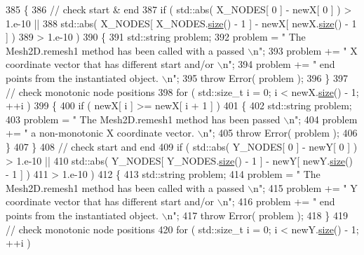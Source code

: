 \begin{DoxyCode}
385   \{
386     \textcolor{comment}{// check start & end}
387     \textcolor{keywordflow}{if} ( std::abs( X\_NODES[ 0 ] - newX[ 0 ] ) > 1.e-10 ||
388          std::abs( X\_NODES[ X\_NODES.\hyperlink{classLuna_1_1Vector_ac9b6ed7a0df401728f27c193fbc8f4d8}{size}() - 1 ] - newX[ newX.\hyperlink{classLuna_1_1Vector_ac9b6ed7a0df401728f27c193fbc8f4d8}{size}() - 1 ] )
389          > 1.e-10 )
390     \{
391       std::string problem;
392       problem = \textcolor{stringliteral}{" The Mesh2D.remesh1 method has been called with a passed \(\backslash\)n"};
393       problem += \textcolor{stringliteral}{" X coordinate vector that has different start and/or \(\backslash\)n"};
394       problem += \textcolor{stringliteral}{" end points from the instantiated object. \(\backslash\)n"};
395       \textcolor{keywordflow}{throw} Error( problem );
396     \}
397     \textcolor{comment}{// check monotonic node positions}
398     \textcolor{keywordflow}{for} ( std::size\_t i = 0; i < newX.\hyperlink{classLuna_1_1Vector_ac9b6ed7a0df401728f27c193fbc8f4d8}{size}() - 1; ++i )
399     \{
400       \textcolor{keywordflow}{if} ( newX[ i ] >= newX[ i + 1 ] )
401       \{
402         std::string problem;
403         problem = \textcolor{stringliteral}{" The Mesh2D.remesh1 method has been passed \(\backslash\)n"};
404         problem += \textcolor{stringliteral}{" a non-monotonic X coordinate vector. \(\backslash\)n"};
405         \textcolor{keywordflow}{throw} Error( problem );
406       \}
407     \}
408     \textcolor{comment}{// check start and end}
409     \textcolor{keywordflow}{if} ( std::abs( Y\_NODES[ 0 ] - newY[ 0 ] ) > 1.e-10 ||
410          std::abs( Y\_NODES[ Y\_NODES.\hyperlink{classLuna_1_1Vector_ac9b6ed7a0df401728f27c193fbc8f4d8}{size}() - 1 ] - newY[ newY.\hyperlink{classLuna_1_1Vector_ac9b6ed7a0df401728f27c193fbc8f4d8}{size}() - 1 ] )
411          > 1.e-10 )
412     \{
413       std::string problem;
414       problem = \textcolor{stringliteral}{" The Mesh2D.remesh1 method has been called with a passed \(\backslash\)n"};
415       problem += \textcolor{stringliteral}{" Y coordinate vector that has different start and/or \(\backslash\)n"};
416       problem += \textcolor{stringliteral}{" end points from the instantiated object. \(\backslash\)n"};
417       \textcolor{keywordflow}{throw} Error( problem );
418     \}
419     \textcolor{comment}{// check monotonic node positions}
420     \textcolor{keywordflow}{for} ( std::size\_t i = 0; i < newY.\hyperlink{classLuna_1_1Vector_ac9b6ed7a0df401728f27c193fbc8f4d8}{size}() - 1; ++i )

\end{DoxyCode}
